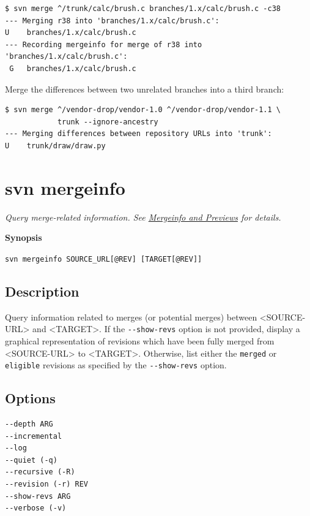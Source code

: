 \begin{verbatim}
$ svn merge ^/trunk/calc/brush.c branches/1.x/calc/brush.c -c38
--- Merging r38 into 'branches/1.x/calc/brush.c':
U    branches/1.x/calc/brush.c
--- Recording mergeinfo for merge of r38 into 'branches/1.x/calc/brush.c':
 G   branches/1.x/calc/brush.c
\end{verbatim}

Merge the differences between two unrelated branches into a third
branch:

\begin{verbatim}
$ svn merge ^/vendor-drop/vendor-1.0 ^/vendor-drop/vendor-1.1 \
            trunk --ignore-ancestry
--- Merging differences between repository URLs into 'trunk':
U    trunk/draw/draw.py
\end{verbatim}

\section{svn mergeinfo}\label{svn.ref.svn.c.mergeinfo}

\emph{Query merge-related information. See
\hyperref[svn.branchmerge.basicmerging.mergeinfo]{Mergeinfo and
Previews} for details.}

\textbf{Synopsis}

\texttt{svn\ mergeinfo\ SOURCE\_URL{[}@REV{]}\ {[}TARGET{[}@REV{]}{]}}

\subsection{Description}

Query information related to merges (or potential merges) between
\textless SOURCE-URL\textgreater{} and \textless TARGET\textgreater. If
the \texttt{-\/-show-revs} option is not provided, display a graphical
representation of revisions which have been fully merged from
\textless SOURCE-URL\textgreater{} to \textless TARGET\textgreater.
Otherwise, list either the \texttt{merged} or \texttt{eligible}
revisions as specified by the \texttt{-\/-show-revs} option.

\subsection{Options}

\begin{verbatim}
--depth ARG
--incremental
--log
--quiet (-q)
--recursive (-R)
--revision (-r) REV
--show-revs ARG
--verbose (-v)
\end{verbatim}

